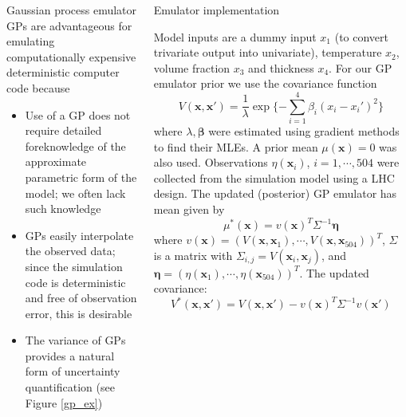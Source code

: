 \documentclass[final]{beamer}
\newlength{\onecolwid}
\newlength{\twocolwid}
\begin{document}
\begin{frame}[t]
\begin{columns}[t]
\begin{column}{\twocolwid}
\begin{columns}[t,totalwidth=\twocolwid]
\begin{column}{\onecolwid}
\begin{alertblock}{Gaussian process emulator}
GPs are advantageous for emulating computationally expensive deterministic computer code\cite{Sacks1989,Santner2003a} because 
\begin{itemize}
\item Use of a GP does not require detailed foreknowledge of the approximate parametric form of the model; we often lack such knowledge
\item GPs easily interpolate the observed data; since the simulation code is deterministic and free of observation error, this is desirable
\item The variance of GPs provides a natural form of uncertainty quantification (see Figure \ref{gp_ex})
\end{itemize}



\end{alertblock}



\end{column} %

\begin{column}{\onecolwid}\vspace{-.6in} %


\begin{alertblock}{Emulator implementation}

Model inputs are a dummy input $x_1$ (to convert trivariate output into univariate), temperature $x_2$, volume fraction $x_3$ and thickness $x_4$. For our GP emulator prior we use the covariance function
\[
V(\mathbf x,\mathbf x' ) = \frac1\lambda \exp\{-\sum_{i=1}^4 \beta_i(x_i-x_i')^2 \}
\]
where $\lambda,\boldsymbol \beta$ were estimated using gradient methods to find their MLEs. 
A prior mean $\mu(\mathbf x) = 0$ was also used. Observations $\eta(\mathbf x_i)$, $i=1,\cdots,504$ were collected from the simulation model using a LHC design. %
The updated (posterior) GP emulator has mean given by
\[\mu^*(\mathbf x) = v(\mathbf x)^T \Sigma^{-1} \boldsymbol \eta \]
where $v(\mathbf x) = (V(\mathbf x, \mathbf x_1),\cdots,V(\mathbf x,\mathbf x_{504}))^T$, $\Sigma$ is a matrix with $\Sigma_{i,j} = V(\mathbf x_i,\mathbf x_j)$, and $\boldsymbol \eta = (\eta(\mathbf x_1),\cdots,\eta(\mathbf x_{504}))^T$. The updated covariance:
\[
V^* (\mathbf x, \mathbf x') = V(\mathbf x, \mathbf x') - v(\mathbf x)^T \Sigma^{-1} v(\mathbf x')
\]
\end{alertblock}


\end{column}
\end{columns}
\end{column}
\end{columns}
\end{frame}
\end{document}
